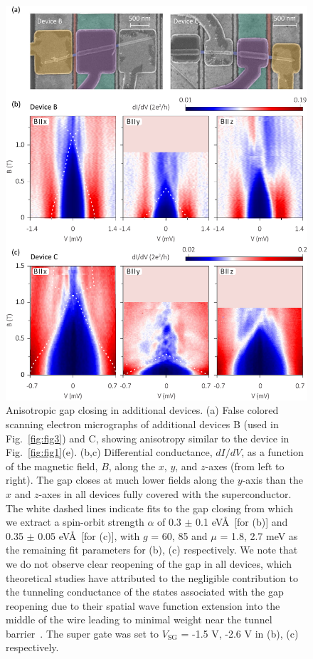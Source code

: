 \begin{figure}
\begin{center}
\centering
\includegraphics[width=\columnwidth]{chapter_spinorbit/figures/SFig1_Bsweeps_reproduced.pdf}
\caption{\label{fig:BsweepsReproduced}
Anisotropic gap closing in additional devices.
(a) False colored scanning electron micrographs of additional devices B (used in Fig.~\ref{fig:fig3}) and C, showing anisotropy similar to the device in Fig.~\ref{fig:fig1}(e).
(b,c) Differential conductance, $dI/dV$, as a function of the magnetic field, $B$, along the $x$, $y$, and $z$-axes (from left to right).
The gap closes at much lower fields along the $y$-axis than the $x$ and $z$-axes in all devices fully covered with the superconductor.
The white dashed lines indicate fits to the gap closing from which we extract a spin-orbit strength $\alpha$ of 0.3 $\pm$ 0.1 eV\AA\ [for (b)] and 0.35 $\pm$ 0.05 eV\AA\ [for (c)], with $g$ = 60, 85 and $\mu$ = 1.8, 2.7 meV as the remaining fit parameters for (b), (c) respectively.
We note that we do not observe clear reopening of the gap in all devices, which theoretical studies have attributed to the negligible contribution to the tunneling conductance of the states associated with the gap reopening due to their spatial wave function extension into the middle of the wire leading to minimal weight near the tunnel barrier~\cite{Prada2012,Pientka2012,Stanescu2012,Liu2019}.
The super gate was set to $V_{\mathrm{SG}}$ = -1.5 V, -2.6 V in (b), (c) respectively.
}
\end{center}
\end{figure}

